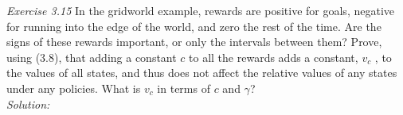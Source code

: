 \documentclass{article}
\begin{document}
\noindent \textit{Exercise 3.15} In the gridworld example, rewards are positive for goals, negative for running into the edge of the world, and zero the rest of the time. Are the signs of these rewards important, or only the intervals between them? Prove, using (3.8), that adding a constant $c$ to all the rewards adds a constant, $v_{c}$ , to the values of all states, and thus does not affect the relative values of any states under any policies. What is $v_{c}$ in terms of $c$ and $\gamma$? \\
\textit{Solution:} \\
\end{document}
